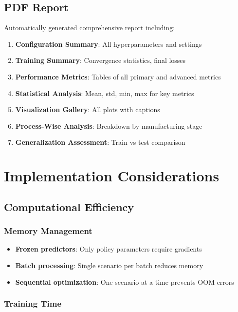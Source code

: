 \documentclass[11pt,a4paper]{article}
\begin{document}
\subsection{PDF Report}

Automatically generated comprehensive report including:
\begin{enumerate}
    \item \textbf{Configuration Summary}: All hyperparameters and settings
    \item \textbf{Training Summary}: Convergence statistics, final losses
    \item \textbf{Performance Metrics}: Tables of all primary and advanced metrics
    \item \textbf{Statistical Analysis}: Mean, std, min, max for key metrics
    \item \textbf{Visualization Gallery}: All plots with captions
    \item \textbf{Process-Wise Analysis}: Breakdown by manufacturing stage
    \item \textbf{Generalization Assessment}: Train vs test comparison
\end{enumerate}

\section{Implementation Considerations}

\subsection{Computational Efficiency}

\subsubsection{Memory Management}

\begin{itemize}
    \item \textbf{Frozen predictors}: Only policy parameters require gradients
    \item \textbf{Batch processing}: Single scenario per batch reduces memory
    \item \textbf{Sequential optimization}: One scenario at a time prevents OOM errors
\end{itemize}

\subsubsection{Training Time}
\end{document}
